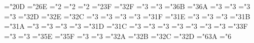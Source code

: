 {  \mathchardef\bbigcirc="2\syb0D
  \mathchardef\bsetminus="2\syb6E
  \mathchardef\bcdot="2
  \mathchardef\bast="2
  \mathchardef\btimes="2
  \mathchardef\bstar="2\mib3F
  \mathchardef\bpropto="3\syb2F
  \mathchardef\bsqsubseteq="3
  \mathchardef\bsqsupseteq="3
  \mathchardef\bparallel="3\syb6B
  \mathchardef\bmid="3\syb6A
  \mathchardef\bdashv="3
  \mathchardef\bvdash="3
  \mathchardef\bnearrow="3
  \mathchardef\bsearrow="3
  \mathchardef\bnwarrow="3\syb2D
  \mathchardef\bswarrow="3\syb2E
  \mathchardef\bLeftrightarrow="3\syb2C
  \mathchardef\bLeftarrow="3
  \mathchardef\bRightarrow="3
  \mathchardef\bleq="3
  \mathchardef\bgeq="3
  \mathchardef\bsucc="3\syb1F
  \mathchardef\bprec="3\syb1E
  \mathchardef\bapprox="3
  \mathchardef\bsucceq="3
  \mathchardef\bpreceq="3
  \mathchardef\bsupset="3\syb1B
  \mathchardef\bsubset="3\syb1A
  \mathchardef\bsupseteq="3
  \mathchardef\bsubseteq="3
  \mathchardef\bin="3
  \mathchardef\bni="3
  \mathchardef\bgg="3\syb1D
  \mathchardef\bll="3\syb1C
  \mathchardef\bnot="3
  \mathchardef\bleftrightarrow="3
  \mathchardef\bleftarrow="3
  \mathchardef\brightarrow="3
  \mathchardef\bmapstochar="3
  \mathchardef\bsim="3
  \mathchardef\bsimeq="3
  \mathchardef\bperp="3\syb3F
  \mathchardef\bequiv="3
  \mathchardef\basymp="3
  \mathchardef\bsmile="3\mib5E
  \mathchardef\bfrown="3\mib5F
  \mathchardef\bleftharpoonup="3
  \mathchardef\bleftharpoondown="3
  \mathchardef\brightharpoonup="3\mib2A
  \mathchardef\brightharpoondown="3\mib2B
  \mathchardef\blhook="3\mib2C
  \mathchardef\brhook="3\mib2D
  \mathchardef\bldotp="6\mib3A
  \mathchardef\bcdotp="6
}



\def\la{\mathrel{\mathchoice {\vcenter{\offinterlineskip\halign{\hfil
$\displaystyle##$\hfil\cr<\cr\sim\cr}}}
{\vcenter{\offinterlineskip\halign{\hfil$\textstyle##$\hfil\cr
<\cr\sim\cr}}}
{\vcenter{\offinterlineskip\halign{\hfil$\scriptstyle##$\hfil\cr
<\cr\sim\cr}}}
{\vcenter{\offinterlineskip\halign{\hfil$\scriptscriptstyle##$\hfil\cr
<\cr\sim\cr}}}}}

\def\ga{\mathrel{\mathchoice {\vcenter{\offinterlineskip\halign{\hfil
$\displaystyle##$\hfil\cr>\cr\sim\cr}}}
{\vcenter{\offinterlineskip\halign{\hfil$\textstyle##$\hfil\cr
>\cr\sim\cr}}}
{\vcenter{\offinterlineskip\halign{\hfil$\scriptstyle##$\hfil\cr
>\cr\sim\cr}}}
{\vcenter{\offinterlineskip\halign{\hfil$\scriptscriptstyle##$\hfil\cr
>\cr\sim\cr}}}}}

